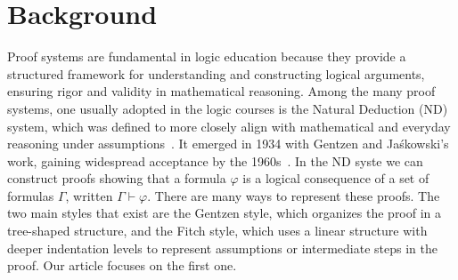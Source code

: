 \section{Background}
Proof systems are fundamental in logic education because they provide a structured framework for understanding and constructing logical arguments, ensuring rigor and validity in mathematical reasoning. Among the many proof systems, one usually adopted in the logic courses is the Natural Deduction (ND) system, which was defined to  more closely align with mathematical and everyday reasoning under assumptions~\cite{nd-mancosu}. It emerged in 1934 with Gentzen and Jaśkowski's work, gaining widespread acceptance by the 1960s~\cite{Pelletier1999-FRAABH}. In the ND syste we can construct proofs showing that a formula \(\varphi\) is a logical consequence of a set of formulas \(\Gamma\), written \(\Gamma \vdash \varphi\). 
There are many ways to represent these proofs. The two main styles that exist are the Gentzen style, which organizes the proof in a tree-shaped structure, and the Fitch style, which uses a linear structure with deeper indentation levels to represent assumptions or intermediate steps in the proof. Our article focuses on the first one. 

